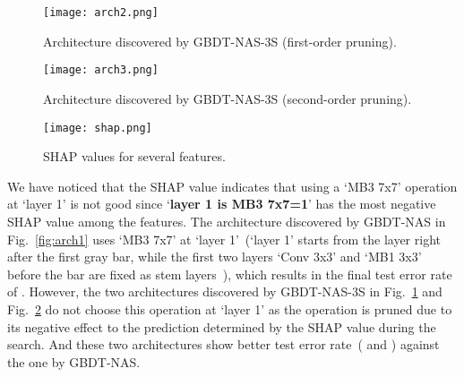 \documentclass{article}
\begin{document}
\begin{figure}[htbp]
\centering
\texttt{[image: arch2.png]}
\caption{Architecture discovered by GBDT-NAS-3S (first-order pruning).}
\label{fig:arch2}
\end{figure}

\begin{figure}[htbp]
\centering
\texttt{[image: arch3.png]}
\caption{Architecture discovered by GBDT-NAS-3S (second-order pruning).}
\label{fig:arch3}
\end{figure}

\begin{figure}[htbp]
\centering
\texttt{[image: shap.png]}
\caption{SHAP values for several features.}
\label{fig:shap}
\end{figure}

We have noticed that the SHAP value indicates that using a `MB3 7x7' operation at `layer 1' is not good since `\textbf{layer 1 is MB3 7x7=1}' has the most negative SHAP value among the features. The architecture discovered by GBDT-NAS in Fig.~\ref{fig:arch1} uses `MB3 7x7' at `layer 1'~(`layer 1' starts from the layer right after the first gray bar, while the first two layers `Conv 3x3' and `MB1 3x3' before the bar are fixed as stem layers~\cite{proxylessnas}), which results in the final test error rate of . However, the two architectures discovered by GBDT-NAS-3S in Fig.~\ref{fig:arch2} and Fig.~\ref{fig:arch3} do not choose this operation at `layer 1' as the operation is pruned due to its negative effect to the prediction determined by the SHAP value during the search. And these two architectures show better test error rate~( and ) against the one by GBDT-NAS.
\end{document}
